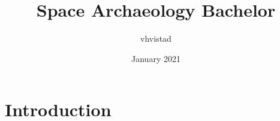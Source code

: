 \documentclass{article}
\title{Space Archaeology Bachelor}
\author{vhvistad }
\date{January 2021}
\begin{document}
\maketitle

\section{Introduction}
\end{document}
